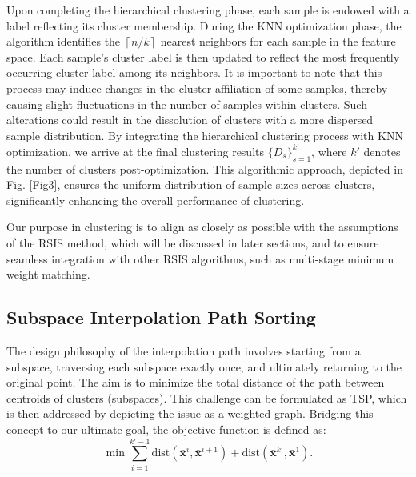 \documentclass[final,3p,times]{elsarticle}
\begin{document}
Upon completing the hierarchical clustering phase, each sample 
is endowed with a label reflecting its cluster membership. 
During the KNN optimization phase, the algorithm identifies 
the $\left\lceil n/k\right\rceil$ nearest neighbors for each 
sample in the feature space. Each sample's cluster label is then 
updated to reflect the most frequently occurring cluster label 
among its neighbors. It is important to note that this process 
may induce changes in the cluster affiliation of some samples, 
thereby causing slight fluctuations in the number of samples 
within clusters. Such alterations could result in the dissolution 
of clusters with a more dispersed sample distribution. By 
integrating the hierarchical clustering process with KNN 
optimization, we arrive at the final clustering results 
$\{D_s\}_{s=1}^{k'}$, where $k'$ denotes the number of clusters 
post-optimization. This algorithmic approach, depicted in 
Fig. \ref{Fig3}, ensures the uniform distribution of sample sizes 
across clusters, significantly enhancing the overall performance 
of clustering.

{\color{myred}Our purpose in clustering is to align as closely as possible 
with the assumptions of the RSIS method, which will be 
discussed in later sections, and to ensure seamless integration
 with other RSIS algorithms, such as multi-stage minimum weight
  matching.}





\subsection{Subspace Interpolation Path Sorting}
The design philosophy of the interpolation path involves starting 
from a subspace, traversing each subspace exactly once, and 
ultimately returning to the original point. 
{The aim is to minimize the total distance of the path between centroids of clusters (subspaces).} 
This challenge can be formulated 
as TSP, which is then addressed 
by depicting the issue as a weighted graph. Bridging this concept 
to our ultimate goal, the objective function is defined as:
\begin{equation}
\label{eq2}
\min{\sum\limits_{i=1}^{k'-1}\text{dist}(\boldsymbol{\bar{x}}^i,
\boldsymbol{\bar{x}}^{i+1})}+\text{dist}(\boldsymbol{\bar{x}}^{k'},
\boldsymbol{\bar{x}}^1). 
\end{equation}
\end{document}

